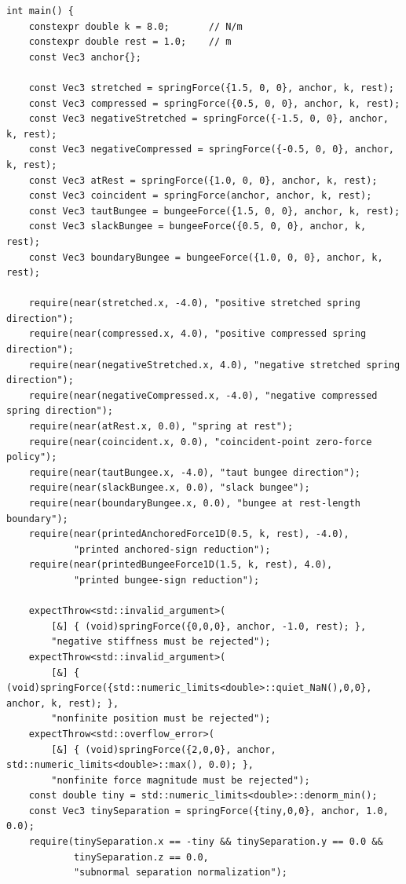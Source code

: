 \begin{verbatim}
int main() {
    constexpr double k = 8.0;       // N/m
    constexpr double rest = 1.0;    // m
    const Vec3 anchor{};

    const Vec3 stretched = springForce({1.5, 0, 0}, anchor, k, rest);
    const Vec3 compressed = springForce({0.5, 0, 0}, anchor, k, rest);
    const Vec3 negativeStretched = springForce({-1.5, 0, 0}, anchor, k, rest);
    const Vec3 negativeCompressed = springForce({-0.5, 0, 0}, anchor, k, rest);
    const Vec3 atRest = springForce({1.0, 0, 0}, anchor, k, rest);
    const Vec3 coincident = springForce(anchor, anchor, k, rest);
    const Vec3 tautBungee = bungeeForce({1.5, 0, 0}, anchor, k, rest);
    const Vec3 slackBungee = bungeeForce({0.5, 0, 0}, anchor, k, rest);
    const Vec3 boundaryBungee = bungeeForce({1.0, 0, 0}, anchor, k, rest);

    require(near(stretched.x, -4.0), "positive stretched spring direction");
    require(near(compressed.x, 4.0), "positive compressed spring direction");
    require(near(negativeStretched.x, 4.0), "negative stretched spring direction");
    require(near(negativeCompressed.x, -4.0), "negative compressed spring direction");
    require(near(atRest.x, 0.0), "spring at rest");
    require(near(coincident.x, 0.0), "coincident-point zero-force policy");
    require(near(tautBungee.x, -4.0), "taut bungee direction");
    require(near(slackBungee.x, 0.0), "slack bungee");
    require(near(boundaryBungee.x, 0.0), "bungee at rest-length boundary");
    require(near(printedAnchoredForce1D(0.5, k, rest), -4.0),
            "printed anchored-sign reduction");
    require(near(printedBungeeForce1D(1.5, k, rest), 4.0),
            "printed bungee-sign reduction");

    expectThrow<std::invalid_argument>(
        [&] { (void)springForce({0,0,0}, anchor, -1.0, rest); },
        "negative stiffness must be rejected");
    expectThrow<std::invalid_argument>(
        [&] { (void)springForce({std::numeric_limits<double>::quiet_NaN(),0,0}, anchor, k, rest); },
        "nonfinite position must be rejected");
    expectThrow<std::overflow_error>(
        [&] { (void)springForce({2,0,0}, anchor, std::numeric_limits<double>::max(), 0.0); },
        "nonfinite force magnitude must be rejected");
    const double tiny = std::numeric_limits<double>::denorm_min();
    const Vec3 tinySeparation = springForce({tiny,0,0}, anchor, 1.0, 0.0);
    require(tinySeparation.x == -tiny && tinySeparation.y == 0.0 &&
            tinySeparation.z == 0.0,
            "subnormal separation normalization");


\end{verbatim}
